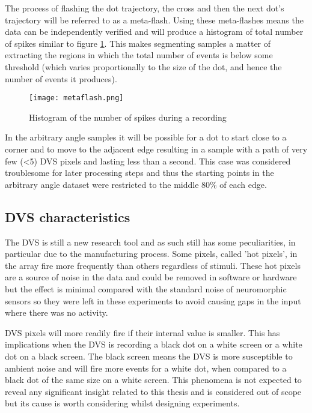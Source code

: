 The process of flashing the dot trajectory, the cross and then the next dot's trajectory will be referred to as a meta-flash. 
Using these meta-flashes means the data can be independently verified and will produce a histogram of total number of spikes similar to figure \ref{fig:spikehistogram}.
This makes segmenting samples a matter of extracting the regions in which the total number of events is below some threshold (which varies proportionally to the size of the dot, and hence the number of events it produces). 

\begin{figure}
    \centering
    \texttt{[image: metaflash.png]}
    \caption{Histogram of the number of spikes during a recording}
    \label{fig:spikehistogram}
\end{figure}



In the arbitrary angle samples it will be possible for a dot to start close to a corner and to move to the adjacent edge resulting in a sample with a path of very few (\textless 5) DVS pixels and lasting less than a second.
This case was considered troublesome for later processing steps and thus the starting points in the arbitrary angle dataset were restricted to the middle 80\% of each edge. 

\subsection{DVS characteristics}

The DVS is still a new research tool and as such still has some peculiarities, in particular due to the manufacturing process.
Some pixels, called 'hot pixels', in the array fire more frequently than others regardless of stimuli. 
These hot pixels are a source of noise in the data and could be removed in software or hardware but the effect is minimal compared with the standard noise of neuromorphic sensors so they were left in these experiments to avoid causing gaps in the input where there was no activity. 

DVS pixels will more readily fire if their internal value is smaller.
This has implications when the DVS is recording a black dot on a white screen or a white dot on a black screen.
The black screen means the DVS is more susceptible to ambient noise and will fire more events for a white dot, when compared to a black dot of the same size on a white screen. 
This phenomena is not expected to reveal any significant insight related to this thesis and is considered out of scope but its cause is worth considering whilst designing experiments. 



